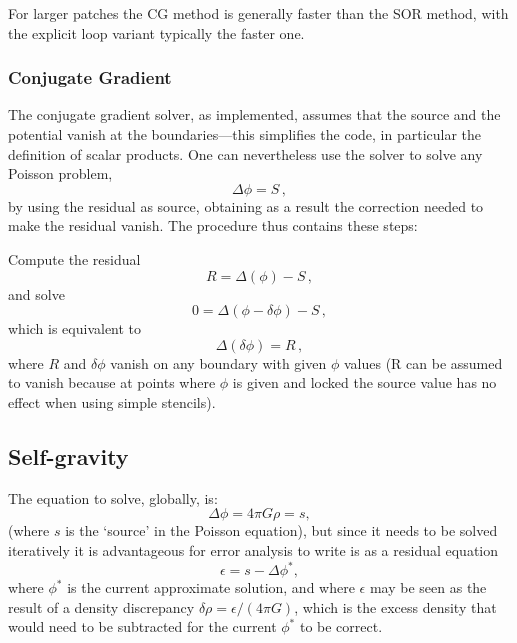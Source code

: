 \documentclass[paper=a4,fontsize=11pt]{scrartcl}
\numberwithin{equation}{section}		%
\numberwithin{figure}{section}			%
\numberwithin{table}{section}				%
\begin{document}
For larger patches the CG method is generally faster than the SOR method, with the explicit loop variant typically the faster one.

\subsubsection{Conjugate Gradient}
The conjugate gradient solver, as implemented, assumes that the source and the potential vanish at the boundaries---this simplifies the code, in particular the definition of scalar products.  One can nevertheless use the solver to solve any Poisson problem, 
\begin{equation}
    \Delta\phi = S \,,
\end{equation}
by using the residual as source, obtaining as a result the correction needed to make the residual vanish. The procedure thus contains these steps:

Compute the residual
\begin{equation}
    R = \Delta(\phi) - S \,,
\end{equation}
and solve
\begin{equation}
    0 = \Delta(\phi - \delta\phi) - S \,,
\end{equation}
which is equivalent to
\begin{equation}
    \Delta(\delta\phi) = R \,,
\end{equation}
where $R$ and $\delta\phi$ vanish on any boundary with given $\phi$ values (R can be assumed to vanish because at points where $\phi$ is given and locked the source value has no effect when using simple stencils).

\subsection{Self-gravity}
The equation to solve, globally, is:
\begin{equation}
    \Delta\phi  = 4\pi G \rho = s , 
\end{equation}
(where $s$ is the `source' in the Poisson equation), but since it needs to be solved iteratively it is advantageous for error analysis to write is as a residual equation
\begin{equation}
    \epsilon = s - \Delta\phi^* , 
\end{equation}
where $\phi^*$ is the current approximate solution, and where $\epsilon$ may be seen as the result of a density discrepancy $\delta \rho=\epsilon/(4\pi G)$, which is the excess density that would need to be subtracted for the current $\phi^*$ to be correct.  
\end{document}
